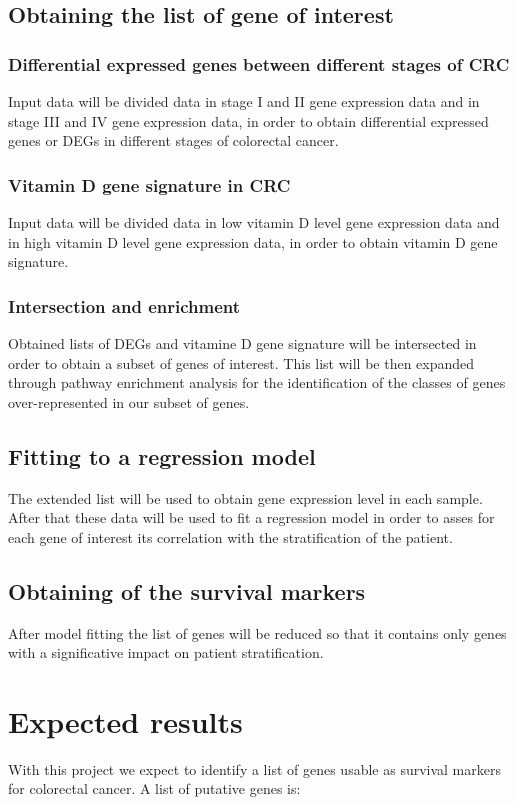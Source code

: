 \documentclass[fleqn,10pt]{SelfArx} %
\begin{document}
	\subsection{Obtaining the list of gene of interest}

		\subsubsection{Differential expressed genes between different stages of CRC}
		Input data will be divided data in stage I and II gene expression data and in stage III and IV gene expression data, in order to obtain differential expressed genes or DEGs in different stages of colorectal cancer.


		\subsubsection{Vitamin D gene signature in CRC}
		Input data will be divided data in low vitamin D level gene expression data and in high vitamin D level gene expression data, in order to obtain vitamin D gene signature.


		\subsubsection{Intersection and enrichment}
		Obtained lists of DEGs and vitamine D gene signature will be intersected in order to obtain a subset of genes of interest. 
		This list will be then expanded through pathway enrichment analysis for the identification of the classes of genes over-represented in our subset of genes.

	\subsection{Fitting to a regression model}
	The extended list will be used to obtain gene expression level in each sample.
	After that these data will be used to fit a regression model in order to asses for each gene of interest its correlation with the stratification of the patient.

	\subsection{Obtaining of the survival markers}
	After model fitting the list of genes will be reduced so that it contains only genes with a significative impact on patient stratification.

\section{Expected results}
With this project we expect to identify a list of genes usable as survival markers for colorectal cancer.
A list of putative genes is:
\end{document}
